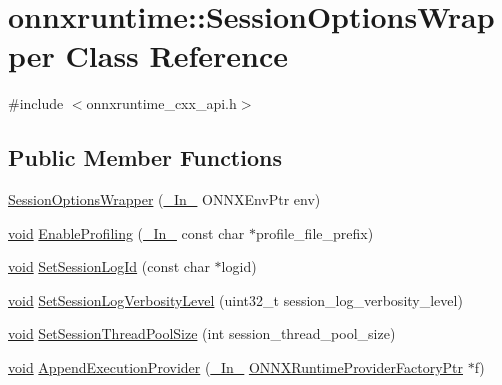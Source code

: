 \hypertarget{classonnxruntime_1_1SessionOptionsWrapper}{}\section{onnxruntime\+:\+:Session\+Options\+Wrapper Class Reference}
\label{classonnxruntime_1_1SessionOptionsWrapper}


{\ttfamily \#include $<$onnxruntime\+\_\+cxx\+\_\+api.\+h$>$}

\subsection*{Public Member Functions}
\begin{DoxyCompactItemize}
\item 
\mbox{\hyperlink{classonnxruntime_1_1SessionOptionsWrapper_a3a057f59b41aad65ab884e404c1d1645}{Session\+Options\+Wrapper}} (\mbox{\hyperlink{visibility__macros_8h_aa74f89aa7d942f4a79ea12d7c9b763ef}{\+\_\+\+In\+\_\+}} O\+N\+N\+X\+Env\+Ptr env)
\item 
\mbox{\hyperlink{mlasi_8h_a88f941d423cb2a819b70a1358982b1a6}{void}} \mbox{\hyperlink{classonnxruntime_1_1SessionOptionsWrapper_aaca0434dec567332dd1903ca2b79d91b}{Enable\+Profiling}} (\mbox{\hyperlink{visibility__macros_8h_aa74f89aa7d942f4a79ea12d7c9b763ef}{\+\_\+\+In\+\_\+}} const char $\ast$profile\+\_\+file\+\_\+prefix)
\item 
\mbox{\hyperlink{mlasi_8h_a88f941d423cb2a819b70a1358982b1a6}{void}} \mbox{\hyperlink{classonnxruntime_1_1SessionOptionsWrapper_aaa117c2bf7dcd2b6a3f6f80c1da8a308}{Set\+Session\+Log\+Id}} (const char $\ast$logid)
\item 
\mbox{\hyperlink{mlasi_8h_a88f941d423cb2a819b70a1358982b1a6}{void}} \mbox{\hyperlink{classonnxruntime_1_1SessionOptionsWrapper_ae4f3f304ad1e004aa054ad9aa7e8a1d8}{Set\+Session\+Log\+Verbosity\+Level}} (uint32\+\_\+t session\+\_\+log\+\_\+verbosity\+\_\+level)
\item 
\mbox{\hyperlink{mlasi_8h_a88f941d423cb2a819b70a1358982b1a6}{void}} \mbox{\hyperlink{classonnxruntime_1_1SessionOptionsWrapper_a62afb71a382b178d482c1a29bc1c6ab7}{Set\+Session\+Thread\+Pool\+Size}} (int session\+\_\+thread\+\_\+pool\+\_\+size)
\item 
\mbox{\hyperlink{mlasi_8h_a88f941d423cb2a819b70a1358982b1a6}{void}} \mbox{\hyperlink{classonnxruntime_1_1SessionOptionsWrapper_a12c895cb5dcfa90dd1455368726ce48f}{Append\+Execution\+Provider}} (\mbox{\hyperlink{visibility__macros_8h_aa74f89aa7d942f4a79ea12d7c9b763ef}{\+\_\+\+In\+\_\+}} \mbox{\hyperlink{session__options__c__api_8h_a351bab8a857e0f355c92af5c22b759bc}{O\+N\+N\+X\+Runtime\+Provider\+Factory\+Ptr}} $\ast$f)

\end{DoxyCompactItemize}
